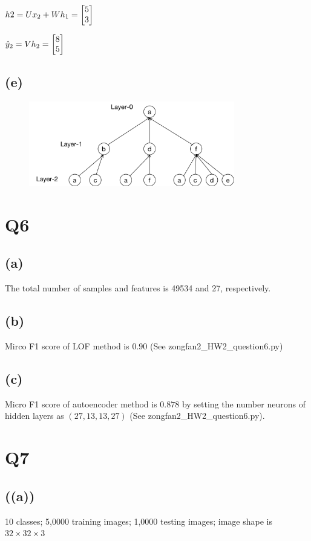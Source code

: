 \documentclass[]{article}
\begin{document}
$h2=Ux_2+Wh_1=\newmat{5\\3}$

$\hat{y}_2=Vh_2=\newmat{8\\5}$

\subsection*{(e)}

\begin{figure}[!ht]
    \centering
    \includegraphics[width=0.8\textwidth]{fig/hw2_q5.png}
\end{figure}

\newpage

\section*{Q6}
\subsection*{(a)}
The total number of samples and features is 49534 and 27, respectively. 

\subsection*{(b)}
Mirco F1 score of LOF method is $0.90$ (See zongfan2\_HW2\_question6.py)

\subsection*{(c)}
Micro F1 score of autoencoder method is $0.878$ by setting the number neurons of hidden layers as $(27, 13, 13, 27)$ (See zongfan2\_HW2\_question6.py).

\newpage
\section*{Q7}
\subsection*{((a))}
10 classes; 5,0000 training images; 1,0000 testing images; image shape is $32\times 32\times3$
\end{document}
